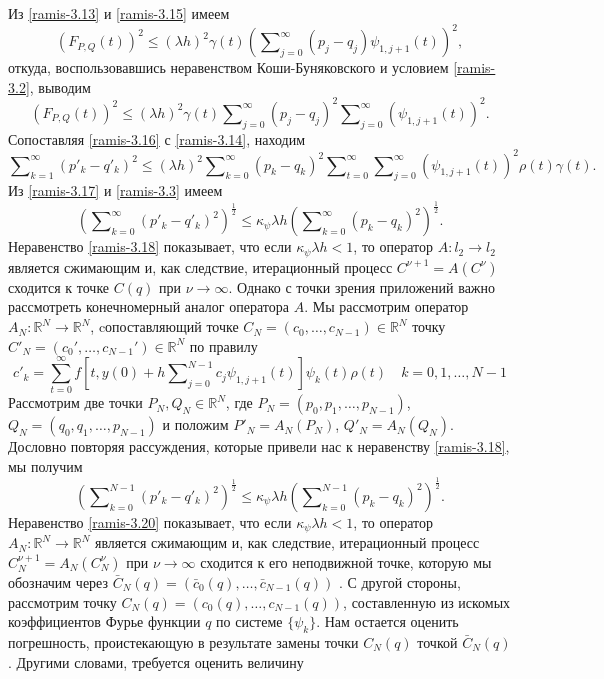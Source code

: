 Из \eqref{ramis-3.13} и \eqref{ramis-3.15}  имеем
$$
(F_{P,Q}(t))^2\le (\lambda h)^2\gamma(t) \left(\sum\nolimits_{j=0}^\infty( p_j-q_j)\psi_{1,j+1}(t)\right)^2,
$$
откуда,  воспользовавшись неравенством Коши-Буняковского и условием \eqref{ramis-3.2}, выводим
 \begin{equation}\label{ramis-3.16}
(F_{P,Q}(t))^2\le(\lambda h)^2 \gamma(t)  \sum\nolimits_{j=0}^\infty( p_j-q_j)^2\sum\nolimits_{j=0}^\infty(\psi_{1,j+1}(t))^2.
\end{equation}
Сопоставляя \eqref{ramis-3.16} с \eqref{ramis-3.14}, находим
\begin{equation}\label{ramis-3.17}
\sum\nolimits_{k=1}^\infty (p'_k-q'_k)^2\le(\lambda h)^2 \sum\nolimits_{k=0}^\infty( p_k-q_k)^2\sum\nolimits_{t=0}^{\infty} \sum\nolimits_{j=0}^\infty(\psi_{1,j+1}(t))^2\rho(t)\gamma(t).
\end{equation}
Из  \eqref{ramis-3.17}  и \eqref{ramis-3.3} имеем
\begin{equation}\label{ramis-3.18}
\left(\sum\nolimits_{k=0}^\infty (p'_k-q'_k)^2\right)^\frac12\le \kappa_\psi\lambda h \left(\sum\nolimits_{k=0}^\infty (p_k-q_k)^2\right)^\frac12. \end{equation}
Неравенство \eqref{ramis-3.18} показывает, что если $\kappa_\psi\lambda h<1$, то оператор  $A:l_2\to l_2$ является сжимающим и, как следствие, итерационный процесс $C^{\nu+1}=A(C^{\nu})$  сходится к точке $C(q)$ при $\nu\to\infty$. Однако с точки зрения приложений важно рассмотреть конечномерный аналог оператора $A$. Мы рассмотрим оператор $A_N:\mathbb{R}^N\to \mathbb{R}^N$, cопоставляющий точке
$C_N=(c_0,\ldots,c_{N-1})\in \mathbb{R}^N $ точку  $C'_N=(c_0',\ldots,c_{N-1}')\in \mathbb{R}^N $ по правилу
\begin{equation}\label{ramis-3.19}
c'_k=\sum_{t=0}^{\infty} f\left[t,y(0)+h\sum\nolimits_{j=0}^{N-1} c_j\psi_{1,j+1}(t)\right]\psi_{k}(t)\rho(t)\quad k=0,1,\ldots,N-1
\end{equation}
 Рассмотрим две точки $P_N,Q_N\in \mathbb{R}^N$, где $P_N=(p_0,p_1,\ldots,p_{N-1})$,\\   $Q_N=(q_0,q_1,\ldots,p_{N-1})$ и положим $P'_N=A_N(P_N)$, $Q'_N=A_N(Q_N)$. Дословно повторяя рассуждения, которые привели нас к неравенству \eqref{ramis-3.18}, мы получим
\begin{equation}\label{ramis-3.20}
\left(\sum\nolimits_{k=0}^{N-1} (p'_k-q'_k)^2\right)^\frac12\le \kappa_\psi\lambda h \left(\sum\nolimits_{k=0}^{N-1} (p_k-q_k)^2\right)^\frac12.
\end{equation}
Неравенство \eqref{ramis-3.20} показывает, что если $\kappa_\psi\lambda h<1$, то оператор  $A_N:\mathbb{R}^N\to \mathbb{R}^N$ является сжимающим и, как следствие, итерационный процесс $C_N^{\nu+1}=A_N(C_N^{\nu})$  при $\nu\to\infty$ сходится к его неподвижной точке, которую мы обозначим через  $\bar C_N(q)=(\bar c_0(q),\ldots,\bar c_{N-1}(q))$ . С другой стороны, рассмотрим точку $C_N(q)=(c_0(q),\ldots,c_{N-1}(q))$, составленную из искомых коэффициентов Фурье функции $q$ по системе $\{\psi_k\}$. Нам остается оценить погрешность, проистекающую в результате замены точки $C_N(q)$ точкой $\bar C_N(q)$. Другими словами, требуется оценить величину
